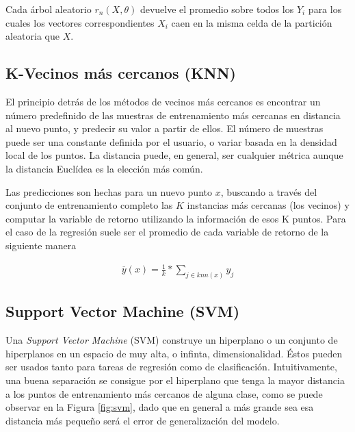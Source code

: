     Cada árbol aleatorio $r_{n}(X, \theta)$ devuelve el promedio sobre todos los
    $Y_{i}$ para los cuales los vectores correspondientes $X_{i}$ caen en la misma
    celda de la partición aleatoria que $X$.


\subsection{K-Vecinos más cercanos (KNN)}
  \par El principio detrás de los métodos de vecinos más cercanos es encontrar un
    número predefinido de las muestras de entrenamiento más cercanas en distancia
    al nuevo punto, y predecir su valor a partir de ellos.
    El número de muestras puede ser una constante definida por el usuario, o
    variar basada en la densidad local de los puntos. La distancia puede, en general,
    ser cualquier métrica aunque la distancia Euclídea es la elección más común.

  \par Las predicciones son hechas para un nuevo punto $x$, buscando a través del conjunto
    de entrenamiento completo las $K$ instancias más cercanas (los vecinos) y computar
    la variable de retorno utilizando la información de esos K puntos. Para el caso
    de la regresión suele ser el promedio de cada variable de retorno de la siguiente
    manera

    \begin{align}
      \overline{y}(x) = \frac{1}{k} * \sum_{j \in knn(x)} y_{j}
    \end{align}



\subsection{Support Vector Machine (SVM)}

  \par Una \textit{Support Vector Machine} (SVM) \cite{first_svm} construye un
    hiperplano o un conjunto de hiperplanos en un espacio
    de muy alta, o infinta, dimensionalidad. Éstos pueden ser usados tanto para
    tareas de regresión como de clasificación. Intuitivamente, una buena separación
    se consigue por el hiperplano que tenga la mayor distancia a los puntos de
    entrenamiento más cercanos de alguna clase, como se puede observar en la
    Figura \ref{fig:svm}, dado que en general
    a más grande sea esa distancia más pequeño será el error de generalización del
    modelo.

